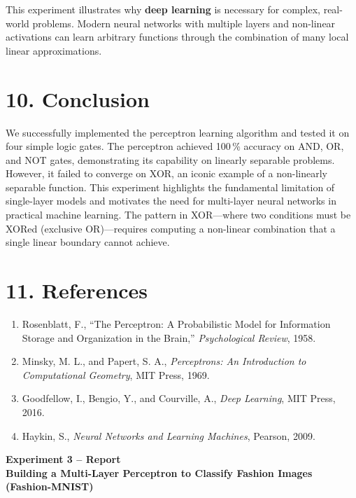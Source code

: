 \documentclass[11pt]{article}
\begin{document}
This experiment illustrates why \textbf{deep learning} is necessary for complex, real-world problems. Modern neural networks with multiple layers and non-linear activations can learn arbitrary functions through the combination of many local linear approximations.

\section*{10. Conclusion}

We successfully implemented the perceptron learning algorithm and tested it on four simple logic gates. The perceptron achieved 100\,\% accuracy on AND, OR, and NOT gates, demonstrating its capability on linearly separable problems. However, it failed to converge on XOR, an iconic example of a non-linearly separable function. This experiment highlights the fundamental limitation of single-layer models and motivates the need for multi-layer neural networks in practical machine learning. The pattern in XOR—where two conditions must be XORed (exclusive OR)—requires computing a non-linear combination that a single linear boundary cannot achieve.

\section*{11. References}
\begin{enumerate}
\item Rosenblatt, F., ``The Perceptron: A Probabilistic Model for Information Storage and Organization in the Brain,'' \emph{Psychological Review}, 1958.
\item Minsky, M. L., and Papert, S. A., \emph{Perceptrons: An Introduction to Computational Geometry}, MIT Press, 1969.
\item Goodfellow, I., Bengio, Y., and Courville, A., \emph{Deep Learning}, MIT Press, 2016.
\item Haykin, S., \emph{Neural Networks and Learning Machines}, Pearson, 2009.
\end{enumerate}

\clearpage


\begin{center}
\Large\textbf{Experiment 3 -- Report}\\
\large\textbf{Building a Multi-Layer Perceptron to Classify Fashion Images (Fashion-MNIST)}
\end{center}
\end{document}
